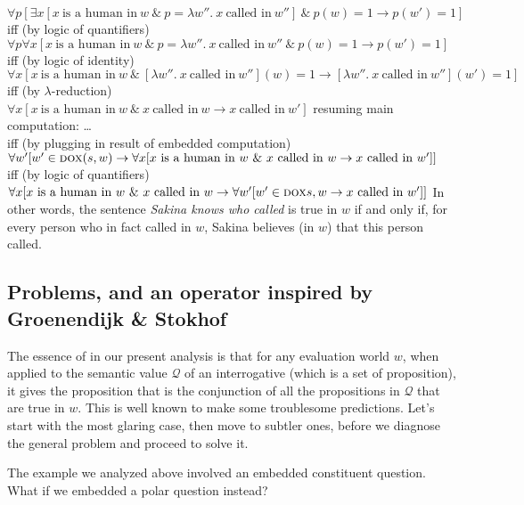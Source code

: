 $\forall p [\exists x [x\ \text{is a human
  in}\ w\ \&\ p=\lambda w''.\ x\ \text{called
  in}\ w'']\ \&\ p(w)=1 \rightarrow p(w')=1 ]$\\
{\small iff (by logic of quantifiers)}\\
$\forall p\forall x [x\ \text{is a human
  in}\ w\ \&\ p=\lambda w''.\ x\ \text{called
  in}\ w''\ \&\ p(w)=1 \rightarrow p(w')=1 ]$\\
{\small iff (by logic of identity)}\\
$\forall x [ x\ \text{is a human in}\ w\ \&\ [\lambda w''.\ x\ \text{called
  in}\ w''](w)=1 \rightarrow [\lambda w''.\ x\ \text{called in}\ w''](w')=1]$\\
{\small iff (by $\lambda$-reduction)}\\
$\forall x [ x\ \text{is a human in}\ w\ \&\ x\ \text{called
  in}\ w \rightarrow x\ \text{called in}\ w']$ \a resuming main computation:
\dots \\
{\small iff (by plugging in result of embedded computation)}\\
$\forall w' [w'\in \textsc{dox}(s,w) \rightarrow \forall x [ x\ \text{is a human
  in}\ w\ \&\ x\ \text{called
  in}\ w \rightarrow x\ \text{called in}\ w']]$\\
{\small iff (by logic of quantifiers)}\\
$\forall x [x\ \text{is a human in}\ w\ \&\ x\ \text{called
  in}\ w \rightarrow \forall w' [w'\in \dox{s,w} \rightarrow x\ \text{called
  in}\ w']]$ \xe
%
In other words, the sentence \emph{Sakina knows who called} is true in $w$ if
and only if, for every person who in fact called in $w$, Sakina believes (in
$w$) that this person called.

\subsection{Problems, and an \ans operator inspired by Groenendijk \& Stokhof}
\label{sec:ANS-GS}

The essence of \ans in our present analysis is that for any evaluation world
$w$, when applied to the semantic value $\mathcal{Q}$ of an interrogative (which
is a set of proposition), it gives the proposition that is the conjunction of
all the propositions in $\mathcal{Q}$ that are true in $w$. This is well known
to make some troublesome predictions. Let's start with the most glaring case,
then move to subtler ones, before we diagnose the general problem and proceed to
solve it.

The example we analyzed above involved an embedded constituent question. What if
we embedded a polar question instead?

